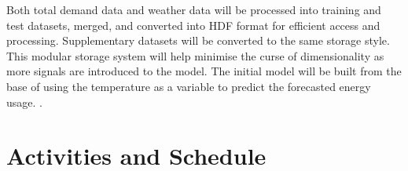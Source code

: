 \documentclass[mstat,12pt]{unswthesis}
\begin{document}
Both total demand data and weather data will be processed into training and test datasets, merged, and converted into HDF format for efficient access and processing. Supplementary datasets will be converted to the same storage style. This modular storage system will help minimise the curse of dimensionality as more signals are introduced to the model. The initial model will be built from the base of using the temperature as a variable to predict the forecasted energy usage. .

\hypertarget{activities-and-schedule}{%
\section{Activities and Schedule}\label{activities-and-schedule}}
\setlength{\parindent}{0pt} %

\end{document}
